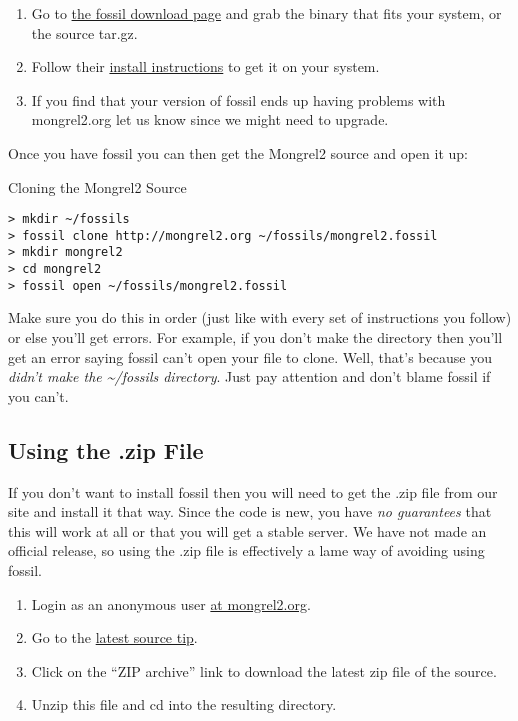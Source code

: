 \begin{enumerate}
\item Go to \href{http://www.fossil-scm.org/download.html}{the fossil download page} and
    grab the binary that fits your system, or the source tar.gz.
\item Follow their \href{http://fossil-scm.org/index.html/doc/tip/www/build.wiki}{install instructions}
    to get it on your system.
\item If you find that your version of fossil ends up having problems with mongrel2.org let us know since
    we might need to upgrade.
\end{enumerate}

Once you have fossil you can then get the Mongrel2 source and open it up:

\begin{code}{Cloning the Mongrel2 Source}
\begin{Verbatim}
> mkdir ~/fossils
> fossil clone http://mongrel2.org ~/fossils/mongrel2.fossil
> mkdir mongrel2
> cd mongrel2
> fossil open ~/fossils/mongrel2.fossil
\end{Verbatim}
\end{code}

Make sure you do this in order (just like with every set of instructions you follow)
or else you'll get errors.  For example, if you don't make the  directory
then you'll get an error saying fossil can't open your file to clone.  Well, that's because
you \emph{didn't make the \~{}/fossils directory}.  Just pay attention and don't blame fossil
if you can't.


\subsection{Using the .zip File}

If you don't want to install fossil then you will need to get the .zip file
from our site and install it that way.  Since the code is new, you have \emph{no guarantees}
that this will work at all or that you will get a stable server.  We have not made an
official release, so using the .zip file is effectively a lame way of avoiding using
fossil.

\begin{enumerate}
\item Login as an anonymous user \href{http://mongrel2.org/login}{at mongrel2.org}.
\item Go to the \href{http://mongrel2.org/info/tip}{latest source tip}.
\item Click on the ``ZIP archive'' link to download the latest zip file of the source.
\item Unzip this file and cd into the resulting directory.
\end{enumerate}


